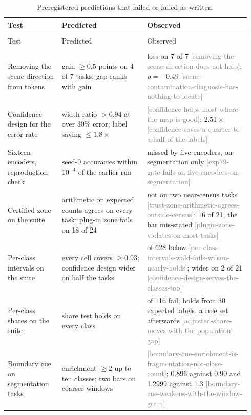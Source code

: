 \documentclass[11pt,a4paper]{article}
\newcommand{\claim}[1]{{\scriptsize\textsf{\textcolor{gray}{[#1]}}}}
\begin{document}
{\footnotesize
\setlength{\LTcapwidth}{\linewidth}
\setlength{\LTpre}{6pt}
\begin{longtable}{@{}>{\raggedright\arraybackslash}p{0.21\linewidth}>{\raggedright\arraybackslash}p{0.33\linewidth}>{\raggedright\arraybackslash}p{0.40\linewidth}@{}}
\caption{Preregistered predictions that failed or failed as written.}\label{tab:failed} \\
\toprule
Test & Predicted & Observed \\
\midrule
\endfirsthead
\multicolumn{3}{@{}l}{\emph{Table~\ref{tab:failed} (continued)}} \\
\toprule
Test & Predicted & Observed \\
\midrule
\endhead
\midrule
\multicolumn{3}{r@{}}{\emph{continued on the next page}} \\
\endfoot
\bottomrule
\endlastfoot
Removing the scene direction from tokens & gain $\ge 0.5$ points on 4 of 7 tasks; gap ranks with gain & loss on 7 of 7 \claim{removing-the-scene-direction-does-not-help}; $\rho = -0.49$ \claim{scene-contamination-diagnosis-has-nothing-to-locate} \\
Confidence design for the error rate & width ratio $> 0.94$ at over 30\% error; label saving $\le 1.8\times$ & 0.9361 \claim{confidence-helps-most-where-the-map-is-good}; $2.51\times$ \claim{confidence-saves-a-quarter-to-a-half-of-the-labels} \\
Sixteen encoders, reproduction check & seed-0 accuracies within $10^{-4}$ of the earlier run & missed by five encoders, on segmentation only \claim{exp79-gate-fails-on-five-encoders-on-segmentation} \\
Certified zone on the suite & arithmetic on expected counts agrees on every task; plug-in zone fails on 18 of 24 & not on two near-census tasks \claim{trust-zone-arithmetic-agrees-outside-census}; 16 of 21, the bar mis-stated \claim{plugin-zone-violates-on-most-tasks} \\
Per-class intervals on the suite & every cell covers $\ge 0.93$; confidence design wider on half the tasks & 14 of 628 below \claim{per-class-intervals-wald-fails-wilson-nearly-holds}; wider on 2 of 21 \claim{confidence-design-serves-the-classes-too} \\
Per-class shares on the suite & share test holds on every class & 12 of 116 fail; holds from 30 expected labels, a rule set afterwards \claim{adjusted-share-moves-with-the-population-gap} \\
Boundary cue on segmentation tasks & enrichment $\ge 2$ up to ten classes; two bars on coarser windows & 1.24 \claim{boundary-cue-enrichment-is-fragmentation-not-class-count}; 0.896 against 0.90 and 1.2999 against 1.3 \claim{boundary-cue-weakens-with-the-window-grain} \\

\end{longtable}}
\end{document}
